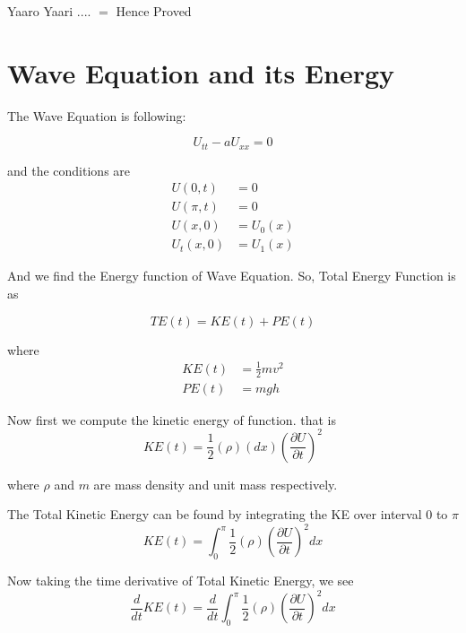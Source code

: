 Yaaro Yaari .... $=$ Hence Proved





\section{Wave Equation and its Energy}
The Wave Equation is following:

\begin{equation}
     U_{tt} - a{U}_{xx} = 0
\end{equation}

and the conditions are 
\begin{align*}
    U(0,t) &= 0\\
    U(\pi,t) &= 0\\
    U(x,0) &= U_{0}(x)\\
    U_{t}(x,0) &= U_{1}(x)
\end{align*}

And we find the Energy function of Wave Equation.
So, Total Energy Function is as

\begin{equation}
    TE(t) = KE(t) + PE(t)
\end{equation}

where 
\begin{align*}
    KE(t) &= \frac{1}{2}mv^2 \\
    PE(t) &= mgh
\end{align*}

Now first we compute the kinetic energy of function. that is
\begin{equation}
    KE(t) = \frac{1}{2}(\rho) (dx) \left(\frac{\partial U}{\partial t} \right)^2
\end{equation}

where $\rho$ and $m$ are mass density and unit mass respectively.

The Total Kinetic Energy can be found by integrating the KE over interval $0$ to $\pi$
\begin{equation}
    KE(t) = \int_{0}^{\pi}\frac{1}{2}(\rho) \left(\frac{\partial U}{\partial t}\right)^2 dx
\end{equation}


Now taking the time derivative of Total Kinetic Energy, we see
\begin{equation}
    \frac{d}{dt}KE(t) = \frac{d}{dt}\int_{0}^{\pi}\frac{1}{2}(\rho) \left(\frac{\partial U}{\partial t}\right)^2 dx
\end{equation}

